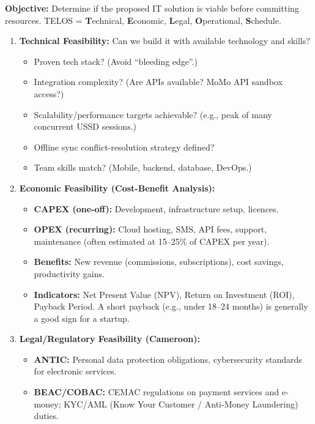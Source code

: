 \documentclass[11pt]{article}
\begin{document}
\begin{methode}
\textbf{Objective:} Determine if the proposed IT solution is viable before committing resources. TELOS = \textbf{T}echnical, \textbf{E}conomic, \textbf{L}egal, \textbf{O}perational, \textbf{S}chedule.
\begin{enumerate}
    \item \textbf{Technical Feasibility:} Can we build it with available technology and skills?
        \begin{itemize}
            \item Proven tech stack? (Avoid ``bleeding edge''.)
            \item Integration complexity? (Are APIs available? MoMo API sandbox access?)
            \item Scalability/performance targets achievable? (e.g., peak of many concurrent USSD sessions.)
            \item Offline sync conflict-resolution strategy defined?
            \item Team skills match? (Mobile, backend, database, DevOps.)
        \end{itemize}
    \item \textbf{Economic Feasibility (Cost-Benefit Analysis):}
        \begin{itemize}
            \item \textbf{CAPEX (one-off):} Development, infrastructure setup, licences.
            \item \textbf{OPEX (recurring):} Cloud hosting, SMS, API fees, support, maintenance (often estimated at 15--25\% of CAPEX per year).
            \item \textbf{Benefits:} New revenue (commissions, subscriptions), cost savings, productivity gains.
            \item \textbf{Indicators:} Net Present Value (NPV), Return on Investment (ROI), Payback Period. A short payback (e.g., under 18--24 months) is generally a good sign for a startup.
        \end{itemize}
    \item \textbf{Legal/Regulatory Feasibility (Cameroon):}
        \begin{itemize}
            \item \textbf{ANTIC:} Personal data protection obligations, cybersecurity standards for electronic services.
            \item \textbf{BEAC/COBAC:} CEMAC regulations on payment services and e-money; KYC/AML (Know Your Customer / Anti-Money Laundering) duties.

\end{itemize}
\end{enumerate}
\end{methode}
\end{document}
